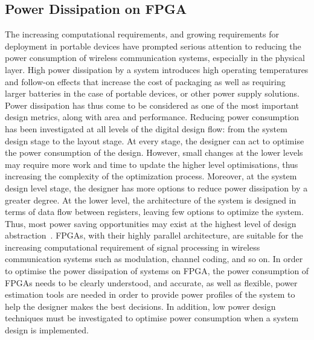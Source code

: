 \subsection{Power Dissipation on FPGA}
The increasing computational requirements, and growing requirements for deployment in portable devices have prompted serious attention to reducing the power consumption of wireless communication systems, especially in the physical layer. 
High power dissipation by a system introduces high operating temperatures and follow-on effects that increase the cost of packaging as well as requiring larger batteries in the case of portable devices, or other power supply solutions.
Power dissipation has thus come to be considered as one of the most important design metrics, along with area and performance.
Reducing power consumption has been investigated at all levels of the digital design flow: from the system design stage to the layout stage. 
At every stage, the designer can act to optimise the power consumption of the design.
However, small changes at the lower levels may require more work and time to update the higher level optimisations, thus increasing the complexity of the optimization process. 
Moreover, at the system design level stage, the designer has more options to reduce power dissipation by a greater degree.
At the lower level, the architecture of the system is designed in terms of data flow between registers, leaving few options to optimize the system. 
Thus, most power saving opportunities may exist at the highest level of design abstraction~\cite{Raghunathan1998}.
FPGAs, with their highly parallel architecture, are suitable for the increasing computational requirement of signal processing in wireless communication systems such as modulation, channel coding, and so on.
In order to optimise the power dissipation of systems on FPGA, the power consumption of FPGAs needs to be clearly understood, and accurate, as well as flexible, power estimation tools are needed in order to provide power profiles of the system to help the designer makes the best decisions.
In addition, low power design techniques must be investigated to optimise power consumption when a system design is implemented.
%
